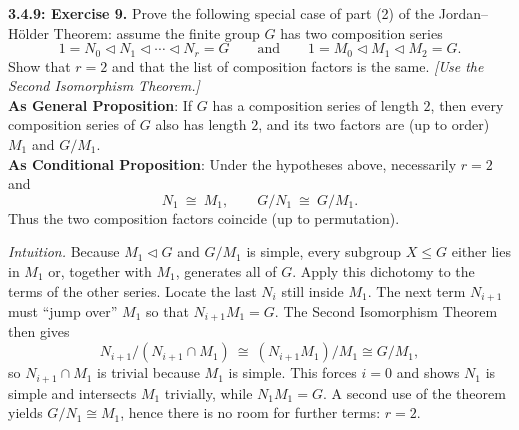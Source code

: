 \documentclass[12pt]{article}
\theoremstyle{definition}
\begin{document}
\newpage

\noindent \textbf{3.4.9: Exercise 9.} Prove the following special case of part (2) of the Jordan–Hölder Theorem: assume the finite group $G$ has two composition series
\[
1=N_0 \lhd N_1 \lhd \cdots \lhd N_r=G
\qquad\text{and}\qquad
1=M_0 \lhd M_1 \lhd M_2=G .
\]
Show that $r=2$ and that the list of composition factors is the same. \emph{[Use the Second Isomorphism Theorem.]}\\ %

\noindent\textbf{As General Proposition}: If $G$ has a composition series of length $2$, then every composition series of $G$ also has length $2$, and its two factors are (up to order) $M_1$ and $G/M_1$.\\

\noindent \textbf{As Conditional Proposition}: Under the hypotheses above, necessarily $r=2$ and
\[
N_1\ \cong\ M_1,\qquad
G/N_1\ \cong\ G/M_1 .
\]
Thus the two composition factors coincide (up to permutation).\\

\newpage

\dotfill

\emph{Intuition.} Because $M_1\lhd G$ and $G/M_1$ is simple, every subgroup $X\le G$ either lies in $M_1$ or, together with $M_1$, generates all of $G$. Apply this dichotomy to the terms of the other series. Locate the last $N_i$ still inside $M_1$. The next term $N_{i+1}$ must “jump over” $M_1$ so that $N_{i+1}M_1=G$. The Second Isomorphism Theorem then gives
\[
N_{i+1}/(N_{i+1}\cap M_1)\ \cong\ (N_{i+1}M_1)/M_1 \cong G/M_1 ,
\]
so $N_{i+1}\cap M_1$ is trivial because $M_1$ is simple. This forces $i=0$ and shows $N_1$ is simple and intersects $M_1$ trivially, while $N_1M_1=G$. A second use of the theorem yields $G/N_1\cong M_1$, hence there is no room for further terms: $r=2$.\\

\dotfill
\end{document}
